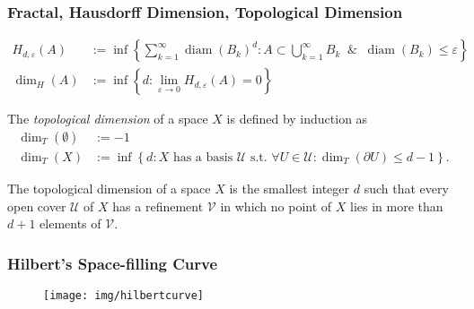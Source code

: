 \documentclass[UTF8,aspectratio=43,11pt,colorlinks,compress,openany]{beamer}%
\begin{document}
\begin{frame}\frametitle{Fractal, Hausdorff Dimension, Topological Dimension}
\setlength\abovedisplayskip{0pt}
\setlength\belowdisplayskip{0pt}
\begin{center}
\end{center}
\begin{align*}
H_{d,\varepsilon}(A)&:=\inf\left\{\sum_{k=1}^\infty\operatorname{diam}(B_k)^d: A\subset\bigcup_{k=1}^\infty B_k\;\;\&\;\;\operatorname{diam}(B_k)\leq\varepsilon\right\}\\
\dim_H(A)&:=\inf\left\{d:\lim_{\varepsilon\to 0} H_{d,\varepsilon}(A)=0\right\}
\end{align*}
\begin{definition}
The \emph{topological dimension} of a space $X$ is defined by induction as
\begin{align*}
\dim_T(\emptyset)&:=-1\\
\dim_T(X)&:=\inf\left\{d: X \textrm{ has a basis } \mathcal{U} \textrm{ s.t. } \forall U\in\mathcal{U}: \dim_T(\partial U)\leq d-1\right\}.
\end{align*}
\end{definition}
The topological dimension of a space $X$ is the smallest integer $d$ such that every open cover $\mathcal{U}$ of $X$ has a refinement $\mathcal{V}$ in which no point of $X$ lies in more than $d+1$ elements of $\mathcal{V}$.
\end{frame}

\begin{frame}\frametitle{Hilbert's Space-filling Curve}
	\begin{figure}
		\texttt{[image: img/hilbertcurve]}
	\end{figure}
	\begin{figure}
	\end{figure}
\end{frame}
\end{document}
